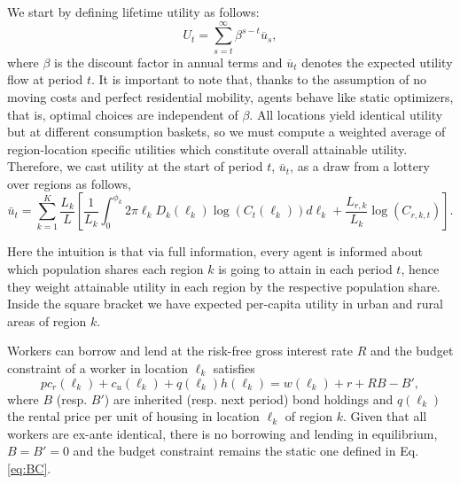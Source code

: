 \documentclass[11pt]{report}
\begin{document}
We start by defining lifetime utility as follows:
\begin{equation}
U_t=\sum_{s=t}^{\infty}\beta^{s-t}\overline{u}_s, \label{B-eq:IntU}
\end{equation}%
where $\beta$ is the discount factor in annual terms and $\overline{u}_t$ denotes the expected utility flow at period $t$. It is important to note that, thanks to the assumption of no moving costs and perfect residential mobility, agents behave like static optimizers, that is, optimal choices are independent of $\beta$. All locations yield identical utility but at different consumption baskets, so we must compute a weighted average of region-location specific utilities which constitute overall attainable utility. Therefore, we cast utility at the start of period $t$, $\overline{u}_t$, as a draw from a lottery over regions as follows,
\begin{equation}
	\bar{u}_t = \sum_{k=1}^K \frac{L_k}{L} \left[ \frac{1}{L_{k}}\int_0^{\phi_k}2 \pi \ell_k D_k(\ell_k)\log(C_t(\ell_k))d\ell_k+\frac{L_{r,k}}{L_k}\log(C_{r,k,t}) \right]. \label{B-eq:EU}
\end{equation}%

Here the intuition is that via full information, every agent is informed about which population shares each region $k$ is going to attain in each period $t$, hence they weight attainable utility in each region by the respective population share. Inside the square bracket we have expected per-capita utility in urban and rural areas of region $k$.

Workers can borrow and lend at the risk-free gross interest rate $R$ and the budget constraint of a worker in location $\ell_k$ satisfies%
\begin{equation}
pc_r(\ell_k)+c_u(\ell_k)+q(\ell_k)h(\ell_k)=w(\ell_k)+r+R B-B',  \label{B-eq:BC-dynamic}
\end{equation}%
where $B$ (resp. $B'$) are inherited (resp. next period) bond holdings and $q(\ell_k)$ the rental price per unit of housing in location $\ell_k$ of region $k$. Given that all workers are ex-ante identical, there is no borrowing and lending in equilibrium, $B=B'=0$ and the budget constraint remains the static one defined in Eq. \ref{eq:BC}.
\end{document}
